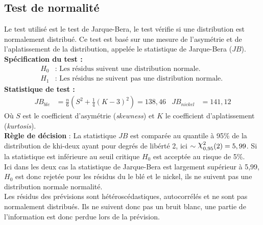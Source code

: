 \subsection*{Test de normalité}
Le test utilisé est le test de Jarque-Bera, le test vérifie si une distribution est normalement distribué. Ce test est basé sur une mesure de l'asymétrie et de l'aplatissement de la distribution, appelée le statistique de Jarque-Bera ($JB$).\\
\textbf{Spécification du test :} 
    \begin{align*}
        H_{0} &: \text{ Les résidus suivent une distribution normale.} \\
        H_{1} &: \text{ Les résidus ne suivent pas une distribution normale. }
    \end{align*}
\textbf{Statistique de test :} 
\begin{align*}
    JB_{ble} &= \frac{n}{6} \left( S^2 + \frac14 (K-3)^2 \right) = 138,46 & JB_{nickel} &= 141,12
\end{align*}
Où $S$ est le coefficient d'asymétrie (\textit{skewness}) et $K$ le coefficient d'aplatissement (\textit{kurtosis}).\\
\textbf{Règle de décision} : La statistique $JB$ est comparée au quantile à 95\% de la distribution de khi-deux ayant pour degrés de libérté 2, ici $\sim \rchi^{2}_{0,95}
(2) = 5,99$. Si la statistique est inférieure au seuil critique $H_{0}$ est acceptée au risque de 5\%.\\
Ici dans les deux cas la statistique de Jarque-Bera est largement supérieur à 5,99, $H_{0}$ est donc rejetée pour les résidus du le blé et le nickel, ils ne suivent pas 
une distribution normale normalité.\\[11pt]
Les résidus des prévisions sont hétéroscédastiques, autocorrélés et ne sont pas normalement distribués. Ils ne suivent donc pas un bruit blanc, une partie de 
l'information est donc perdue lors de la prévision.